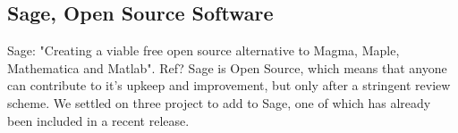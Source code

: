 \documentclass[a0,landscape]{a0poster}
\begin{document}
\vspace{1cm}
\begin{multicols}{3}




\color{Brown}
\section*{Sage, Open Source Software}
Sage: "Creating a viable free open source alternative to Magma, Maple, Mathematica and Matlab".
Ref?
Sage is Open Source, which means that anyone can contribute to it's upkeep and improvement, but only after a stringent review scheme.
We settled on three project to add to Sage, one of which has already been included in a recent release.


\end{multicols}
\end{document}
